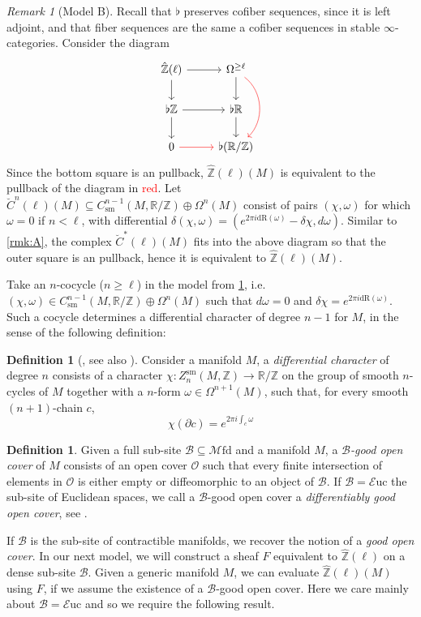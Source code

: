 \documentclass[10pt]{amsart}
\newcommand{\B}{\mathscr{B}}
\newcommand{\bR}{\mathbb{R}}
\newcommand{\bZ}{\mathbb{Z}}
\newcommand{\Euc}{\mathscr{E}\mathrm{uc}}
\newcommand{\Mfd}{\mathscr{M}\mathrm{fd}}
\newcommand{\dr}{\mathrm{dR}}
\newcommand{\sm}{\mathrm{sm}}
\theoremstyle{definition}
\newtheorem{definition}[equation]{Definition}
\theoremstyle{remark}
\newtheorem{remark}[equation]{Remark}
\numberwithin{equation}{section}
\begin{document}
\begin{remark}[Model B]\label{rmk:B} Recall that $\flat$ preserves cofiber sequences, since it is left adjoint, and that fiber sequences are the same a cofiber sequences in stable $\infty$-categories. Consider the diagram
  \[\begin{tikzcd}
    \hat{\bZ}(\ell)\arrow[r]\arrow[d] & \Omega^{\geq \ell}\arrow[d]\arrow[dd,bend left=5em,color=red] \\
    \flat\bZ \arrow[r]\arrow[d] & \flat\bR\arrow[d] \\
    0\arrow[r,color=red] & \flat(\bR/\bZ)
  \end{tikzcd}\]
  Since the bottom square is an pullback, $\hat{\bZ}(\ell)(M)$ is equivalent to the pullback of the diagram in \textcolor{red}{red}. Let $\breve{C}^{n}(\ell)(M)\subseteq C_\sm^{n-1}(M,\bR/\bZ)\oplus\Omega^n(M)$ consist of pairs $(\chi,\omega)$ for which $\omega=0$ if $n<\ell$, with differential $\delta(\chi,\omega)=(e^{2\pi i\dr(\omega)}-\delta\chi,d\omega)$. Similar to \cref{rmk:A}, the complex $\breve{C}^*(\ell)(M)$ fits into the above diagram so that the outer square is an pullback, hence it is equivalent to $\hat{\bZ}(\ell)(M)$.
\end{remark}
Take an $n$-cocycle ($n\geq\ell$) in the model from \cref{rmk:B}, i.e. $(\chi,\omega)\in C_\sm^{n-1}(M,\bR/\bZ)\oplus\Omega^{n}(M)$ such that $d\omega=0$ and $\delta\chi=e^{2\pi i\dr(\omega)}$. Such a cocycle determines a differential character of degree $n-1$ for $M$, in the sense of the following definition:
\begin{definition}[{\cite[Definition 3.4]{hopkinssinger2005diffcoh}}, see also {\cite[Chapter 5]{barbecker2014diffchar}}] Consider a manifold $M$, a \emph{differential character} of degree $n$ consists of a character $\chi:Z^\sm_{n}(M,\bZ)\to\bR/\bZ$ on the group of smooth $n$-cycles of $M$ together with a $n$-form $\omega\in\Omega^{n+1}(M)$, such that, for every smooth $(n+1)$-chain $c$, \[\chi(\partial c)=e^{2\pi i\int_c\omega}\]
\end{definition}
\begin{definition}
  Given a full sub-site $\B\subseteq\Mfd$ and a manifold $M$, a $\B$\emph{-good open cover} of $M$ consists of an open cover $\mathscr{O}$ such that every finite intersection of elements in $\mathscr{O}$ is either empty or diffeomorphic to an object of $\B$. If $\B=\Euc$ the sub-site of Euclidean spaces, we call a $\B$-good open cover a \emph{differentiably good open cover}, see \cite[Definition 6.3.9]{fiorenza2011cechcocyclesdifferentialcharacteristic}. 
\end{definition}If $\B$ is the sub-site of contractible manifolds, we recover the notion of a \emph{good open cover}. In our next model, we will construct a sheaf $F$ equivalent to $\hat{\bZ}(\ell)$ on a dense sub-site $\B$. Given a generic manifold $M$, we can evaluate $\hat{\bZ}(\ell)(M)$ using $F$, if we assume the existence of a $\B$-good open cover. Here we care mainly about $\B=\Euc$ and so we require the following result. 
\end{document}
